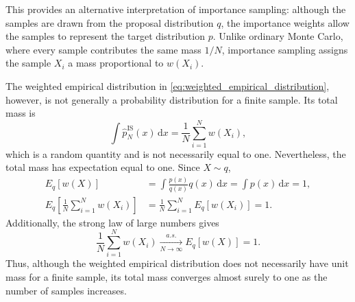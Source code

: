 This provides an alternative interpretation of importance sampling:
although the samples are drawn from the proposal distribution $q$, the
importance weights allow the samples to represent the target distribution
$p$. Unlike ordinary Monte Carlo, where every sample contributes the same
mass $1/N$, importance sampling assigns the sample $X_i$ a mass
proportional to $w(X_i)$.

The weighted empirical distribution in
\eqref{eq:weighted_empirical_distribution}, however, is not generally a
probability distribution for a finite sample. Its total mass is
\begin{equation}
    \int \hat{p}_N^{\mathrm{IS}}(x)\,\mathrm{d}x = \frac{1}{N} \sum_{i=1}^N w(X_i),
\end{equation}
which is a random quantity and is not necessarily equal to one.
Nevertheless, the total mass has expectation equal to one. Since $X\sim q$,
\begin{align}
    E_q[w(X)] &= \int \frac{p(x)}{q(x)}q(x)\,\mathrm{d}x = \int p(x)\,\mathrm{d}x = 1, \\
    E_q\left[\frac{1}{N}\sum_{i=1}^N w(X_i)\right] &= \frac{1}{N}\sum_{i=1}^N E_q[w(X_i)] = 1.
\end{align}
Additionally, the strong law of large numbers gives
\begin{equation}
    \frac{1}{N}\sum_{i=1}^N w(X_i) \xrightarrow[N\to\infty]{a.s.} E_q[w(X)] = 1.
\end{equation}
Thus, although the weighted empirical distribution does not necessarily
have unit mass for a finite sample, its total mass converges almost surely
to one as the number of samples increases.

